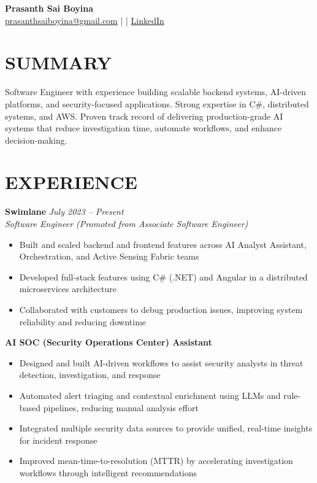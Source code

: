 \documentclass[letterpaper,11pt]{article}
\begin{document}
\begin{center}
    {\LARGE \textbf{Prasanth Sai Boyina}} \\
    \vspace{2pt}
    \href{mailto:prasanthsaiboyina@gmail.com}{prasanthsaiboyina@gmail.com} \;| \;|\;
    \href{https://in.linkedin.com/in/prasanth-sai-b-b6029823b}{LinkedIn}
\end{center}

\vspace{-8pt}

\section*{SUMMARY}
Software Engineer with experience building scalable backend systems, AI-driven platforms, and security-focused applications. Strong expertise in C\#, distributed systems, and AWS. Proven track record of delivering production-grade AI systems that reduce investigation time, automate workflows, and enhance decision-making.

\vspace{-6pt}

\section*{EXPERIENCE}

\textbf{Swimlane} \hfill \textit{July 2023 -- Present} \\
\textit{Software Engineer (Promoted from Associate Software Engineer)}

\begin{itemize}
    \item Built and scaled backend and frontend features across AI Analyst Assistant, Orchestration, and Active Sensing Fabric teams
    \item Developed full-stack features using C\# (.NET) and Angular in a distributed microservices architecture
    \item Collaborated with customers to debug production issues, improving system reliability and reducing downtime
\end{itemize}

\textbf{AI SOC (Security Operations Center) Assistant}
\begin{itemize}
    \item Designed and built AI-driven workflows to assist security analysts in threat detection, investigation, and response
    \item Automated alert triaging and contextual enrichment using LLMs and rule-based pipelines, reducing manual analysis effort
    \item Integrated multiple security data sources to provide unified, real-time insights for incident response
    \item Improved mean-time-to-resolution (MTTR) by accelerating investigation workflows through intelligent recommendations
\end{itemize}
\end{document}
